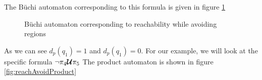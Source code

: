 The B\"{u}chi automaton corresponding to this formula is given in figure \ref{fig:ReachAvoid}

\begin{figure}
\centering
{}
\caption{B\"{u}chi automaton corresponding to reachability while avoiding regions }
\label{fig:ReachAvoid}
\end{figure}

As we can see $d_p(q_1)=1$ and $d_p(q_1)=0$. For our example, we will look at the specific formula $\neg \pi_4 \bm{\mathcal{U}} \pi_5$ The product automaton is shown in figure \ref{fig:reachAvoidProduct}

